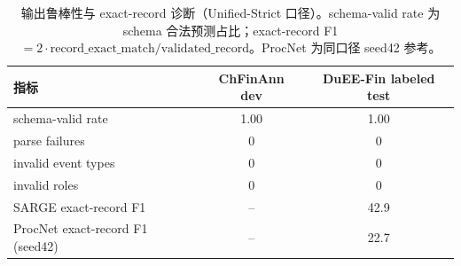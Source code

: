 \begin{table}[htbp]
\centering
\caption{输出鲁棒性与 exact-record 诊断（Unified-Strict 口径）。schema-valid rate 为 schema 合法预测占比；exact-record F1 $=2\cdot\text{record\_exact\_match}/\text{validated\_record}$。ProcNet 为同口径 seed42 参考。}
\label{tab:robustness}
\small
\begin{tabular}{lSS}
\toprule
指标 & {ChFinAnn dev} & {DuEE-Fin labeled test} \\
\midrule
schema-valid rate & 1.00 & 1.00 \\
parse failures & 0 & 0 \\
invalid event types & 0 & 0 \\
invalid roles & 0 & 0 \\
\midrule
SARGE exact-record F1 &  & 42.9 \\
ProcNet exact-record F1 (seed42) &  & 22.7 \\
\bottomrule
\end{tabular}
\end{table}
